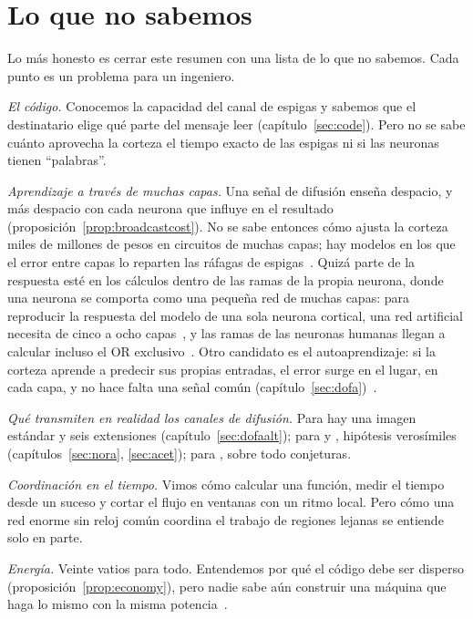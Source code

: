 \section{Lo que no sabemos}

Lo más honesto es cerrar este resumen con una lista de lo que no sabemos. Cada punto es un problema para un ingeniero.

\emph{El código.} Conocemos la capacidad del canal de espigas y sabemos que el destinatario elige qué parte del mensaje leer (capítulo~\ref{sec:code}). Pero no se sabe cuánto aprovecha la corteza el tiempo exacto de las espigas ni si las neuronas tienen “palabras”.

\emph{Aprendizaje a través de muchas capas.} Una señal de difusión enseña despacio, y más despacio con cada neurona que influye en el resultado (proposición~\ref{prop:broadcastcost}). No se sabe entonces cómo ajusta la corteza miles de millones de pesos en circuitos de muchas capas; hay modelos en los que el error entre capas lo reparten las ráfagas de espigas~\cite{Payeur2021}. Quizá parte de la respuesta esté en los cálculos dentro de las ramas de la propia neurona, donde una neurona se comporta como una pequeña red de muchas capas: para reproducir la respuesta del modelo de una sola neurona cortical, una red artificial necesita de cinco a ocho capas~\cite{Beniaguev2021}, y las ramas de las neuronas humanas llegan a calcular incluso el OR exclusivo~\cite{Gidon2020}. Otro candidato es el autoaprendizaje: si la corteza aprende a predecir sus propias entradas, el error surge en el lugar, en cada capa, y no hace falta una señal común (capítulo~\ref{sec:dofa})~\cite{Keller2018}.

\emph{Qué transmiten en realidad los canales de difusión.} Para  hay una imagen estándar y seis extensiones (capítulo~\ref{sec:dofaalt}); para  y , hipótesis verosímiles (capítulos~\ref{sec:nora}, \ref{sec:acet}); para , sobre todo conjeturas.

\emph{Coordinación en el tiempo.} Vimos cómo calcular una función, medir el tiempo desde un suceso y cortar el flujo en ventanas con un ritmo local. Pero cómo una red enorme sin reloj común coordina el trabajo de regiones lejanas se entiende solo en parte.

\emph{Energía.} Veinte vatios para todo. Entendemos por qué el código debe ser disperso (proposición~\ref{prop:economy}), pero nadie sabe aún construir una máquina que haga lo mismo con la misma potencia~\cite{MehonicKenyon2022}.

